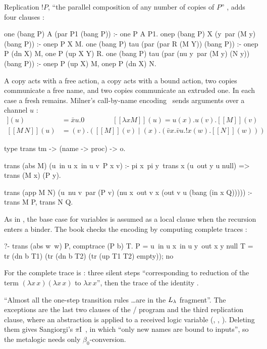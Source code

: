 {{Replication $!P$, ``the parallel composition of any number of copies of $P$'' , adds four
clauses :
\begin{lprolog}
one  (bang P) A (par P1 (bang P)) :- one P A P1.
onep (bang P) X (y\ par (M y) (bang P)) :- onep P X M.
one  (bang P) tau (par (par R (M Y)) (bang P)) :-
     onep P (dn X) M, one P (up X Y) R.
one  (bang P) tau (par (nu y\ par (M y) (N y)) (bang P)) :-
     onep P (up X) M, onep P (dn X) N.
\end{lprolog}
\noindent A copy acts with a free action, a copy acts with a bound action, two copies communicate a free
name, and two copies communicate an extruded one. In each case a fresh  remains. Milner's call-by-name encoding~\cite{Milner1990} sends arguments over a channel $u$
:
\begin{align*}
  [\![x]\!](u) &= \bar x u.0 \qquad\qquad
  [\![\lambda x M]\!](u) = u(x).u(v).[\![M]\!](v)\\
  [\![M\,N]\!](u) &= (v).([\![M]\!](v)\mid(x).(\bar v x.\bar v u.!x(w).[\![N]\!](w)))
\end{align*}
\begin{lprolog}
type trans  tm -> (name -> proc) -> o.

trans (abs M) (u\ in u x\ in u v\ P x v) :-
    pi x\ pi y\ trans x (u\ out y u null) => trans (M x) (P y).

trans (app M N)
      (u\ nu v\ par (P v)
                    (nu x\ out v x (out v u (bang (in x Q))))) :-
    trans M P, trans N Q.
\end{lprolog}
\noindent As in , the base case for variables is assumed as a local clause when the recursion
enters a binder. The book checks the encoding by computing complete traces :
\begin{lprolog}
?- trans (abs w\ w) P, comptrace (P b) T.
P = u\ in u x\ in u y\ out x y null
T = tr (dn b T1) (tr (dn b T2) (tr (up T1 T2) empty));
no
\end{lprolog}
\noindent For  the complete trace is
: three silent steps
``corresponding to reduction of the term $(\lambda x\,x)(\lambda x\,x)$ to $\lambda x\,x$'', then the trace of the
identity .

\begin{remark}
``Almost all the one-step transition rules \ldots are in the $L_\lambda$ fragment''. The exceptions are the last
two clauses of the / program and the third replication clause, where an abstraction is applied
to a received logic variable (, , ). Deleting them gives Sangiorgi's
$\pi$I~\cite{Sangiorgi1996}, in which ``only new names are bound to inputs'', so the metalogic needs only
$\beta_0$-conversion.
\end{remark}

}}
